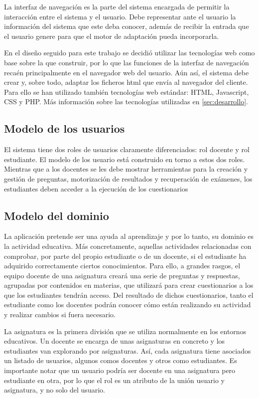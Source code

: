 La interfaz de navegación es la parte del sistema encargada de permitir la interacción entre el sistema y el usuario. Debe representar ante el usuario la información del sistema que este deba conocer, además de recibir la entrada que el usuario genere para que el motor de adaptación pueda incorporarla.

En el diseño seguido para este trabajo se decidió utilizar las tecnologías web como base sobre la que construir, por lo que las funciones de la interfaz de navegación recaén principalmente en el navegador web del usuario. Aún así, el sistema debe crear y, sobre todo, adaptar los ficheros html que envía al navegador del cliente. Para ello se han utilizado también tecnologías web estándar: HTML, Javascript, CSS y PHP. Más información sobre las tecnologías utilizadas en \ref{sec:desarrollo}.

\subsection{Modelo de los usuarios}


El sistema tiene dos roles de usuarios claramente diferenciados: rol docente y rol estudiante. El modelo de los usuario está construido en torno a estos dos roles. Mientras que a los docentes se les debe mostrar herramientas para la creación y gestión de preguntas, motorización de resultados y recuperación de exámenes, los estudiantes deben acceder a la ejecución de los cuestionarios

\subsection{Modelo del dominio}

La aplicación pretende ser una ayuda al aprendizaje y por lo tanto, su dominio es la actividad educativa. Más concretamente, aquellas actividades relacionadas con comprobar, por parte del propio estudiante o de un docente, si el estudiante ha adquirido correctamente ciertos conocimientos. Para ello, a grandes rasgos, el equipo docente de una asignatura creará una serie de preguntas y respuestas, agrupadas por contenidos en materias, que utilizará para crear cuestionarios a los que los estudiantes tendrán acceso. Del resultado de dichos cuestionarios, tanto el estudiante como los docentes podrán conocer cómo están realizando su actividad y realizar cambios si fuera necesario.

La asignatura es la primera división que se utiliza normalmente en los entornos educativos. Un docente se encarga de unas asignaturas en concreto y los estudiantes van explorando por asignaturas. Así, cada asignatura tiene asociados un listado de usuarios, algunos comos docentes y otros como estudiantes. Es importante notar que un usuario podría ser docente en una asignatura pero estudiante en otra, por lo que el rol es un atributo de la unión usuario y asignatura, y no solo del usuario.

